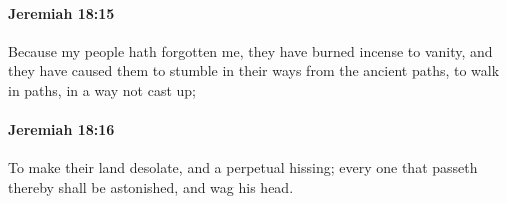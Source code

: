 		\paragraph{Jeremiah 18:15} %
			\label{JEREMIAH-18-15}

			Because my people hath forgotten me, they have burned incense to vanity, and they have caused them to stumble in their ways from the ancient paths, to walk in paths, in a way not cast up;


		\paragraph{Jeremiah 18:16} %
			\label{JEREMIAH-18-16}

			To make their land desolate, and a perpetual hissing; every one that passeth thereby shall be astonished, and wag his head.


